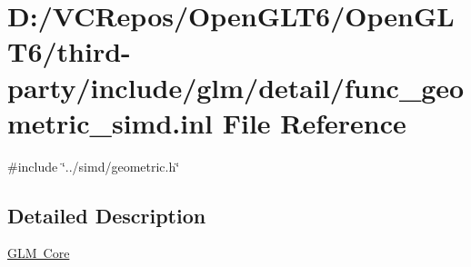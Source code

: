 \hypertarget{func__geometric__simd_8inl}{}\section{D\+:/\+V\+C\+Repos/\+Open\+G\+L\+T6/\+Open\+G\+L\+T6/third-\/party/include/glm/detail/func\+\_\+geometric\+\_\+simd.inl File Reference}
\label{func__geometric__simd_8inl}
{\ttfamily \#include \char`\"{}../simd/geometric.\+h\char`\"{}}\newline


\subsection{Detailed Description}
\mbox{\hyperlink{group__core}{G\+LM Core}} 